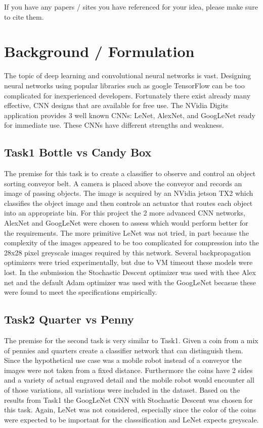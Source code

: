 \documentclass[10pt,journal,compsoc]{IEEEtran}
\begin{document}
If you have any papers / sites you have referenced for your idea, please make sure to cite them.

\section{Background / Formulation}
The topic of deep learning and convolutional neural networks is vast. Designing neural networks using popular libraries such as google TensorFlow can be too complicated for inexperienced developers. Fortunately there exist already many effective, CNN designs that are available for free use. The NVidia Digits application provides 3 well known CNNs: LeNet, AlexNet, and GoogLeNet ready for immediate use. These CNNs have different strengths and weakness.

\subsection{Task1 Bottle vs Candy Box}
The premise for this task is to create a classifier to observe and control an object sorting conveyor belt. A camera is placed above the conveyor and records an image of passing objects. The image is acquired by an NVidia jetson TX2 which classifies the object image and then controls an actuator that routes each object into an appropriate bin. For this project the 2 more advanced CNN networks, AlexNet and GoogLeNet were chosen to assess which would perform better for the requirements. The more primitive LeNet was not tried, in part because the complexity of the images appeared to be too complicated for compression into the 28x28 pixel greyscale images required by this network.
Several backpropagation optimizers were tried experimentally, but due to VM timeout these models were lost. In the submission the Stochastic Descent optimizer was used with thee Alex net and the default Adam optimizer was used with the GoogLeNet becasue these were found to meet the specifications empirically.

\subsection{Task2 Quarter vs Penny}
The premise for the second task is very similar to Task1. Given a coin from a mix of pennies and quarters create a classifier network that can distinguish them. Since the hypothetical use case was a mobile robot instead of a conveyor the images were not taken from a fixed distance. Furthermore the coins have 2 sides and a variety of actual engraved detail and the mobile robot would encounter all of those variations, all variations were included in the dataset. Based on the results from Task1 the GoogLeNet CNN with Stochastic Descent was chosen for this task. Again, LeNet was not considered, especially since the color of the coins were expected to be important for the classsification and LeNet expects greyscale. 
\end{document}
